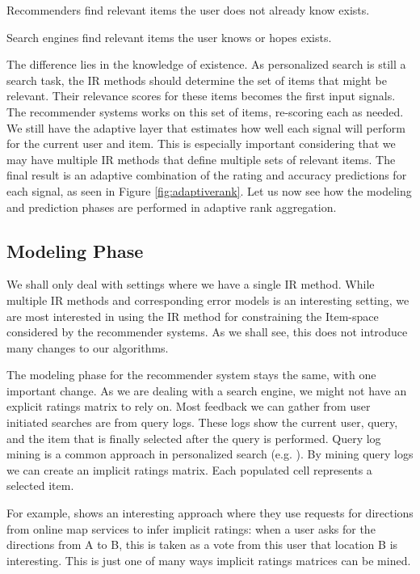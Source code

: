\begin{itemize*}
  \item Recommenders find relevant items the user does not already know exists.
  \item Search engines find relevant items the user knows or hopes exists.
\end{itemize*}

The difference lies in the knowledge of existence.
As personalized search is still a search task, the IR methods should determine the set of items that might be relevant.
Their relevance scores for these items becomes the first input signals.
The recommender systems works on this set of items, re-scoring each as needed.
We still have the adaptive layer that estimates how well each signal will perform for the current user and item.
This is especially important considering that we may have multiple IR methods that define multiple sets of relevant items.
The final result is an adaptive combination of the rating and accuracy predictions for each signal,
as seen in Figure \ref{fig:adaptiverank}.
Let us now see how the modeling and prediction phases are performed in adaptive rank aggregation.



\subsection{Modeling Phase}

We shall only deal with settings where we have a single IR method.
While multiple IR methods and corresponding error models is an interesting
setting, we are most interested in using the IR method for constraining the Item-space considered by the recommender systems.
As we shall see, this does not introduce many changes to our algorithms.

The modeling phase for the recommender system stays the same, with one important change.
As we are dealing with a search engine, we might not have an explicit ratings matrix to rely on.
Most feedback we can gather from user initiated searches are from query logs.
These logs show the current user, query, and the item that is finally selected after the query is performed.
Query log mining is a common approach in personalized search
(e.g. \cite{Liu2002, Sugiyama2004, Shen2005, Speretta2000}).
By mining query logs we can create an implicit ratings matrix.
Each populated cell represents a selected item.

For example, \cite{Venetis2011} shows an interesting approach where they use requests for directions
from online map services to infer implicit ratings:
when a user asks for the directions from A to B, this is taken 
as a vote from this user that location B is interesting.
This is just one of many ways implicit ratings matrices can be mined.

